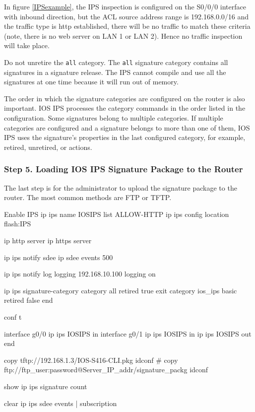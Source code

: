 In figure \ref{IPSexample}, the IPS inspection is configured on the S0/0/0 interface with inbound direction, but the ACL source address range is 192.168.0.0/16 and the traffic type is http established, there will be no traffic to match these criteria (note, there is no web server on LAN 1 or LAN 2). Hence no traffic inspection will take place.

\note Do not unretire the \verb|all| category. The \verb|all| signature category contains all signatures in a signature release. The IPS cannot compile and use all the signatures at one time because it will run out of memory.

\note The order in which the signature categories are configured on the router is also important. IOS IPS processes the category commands in the order listed in the configuration. Some signatures belong to multiple categories. If multiple categories are configured and a signature belongs to more than one of them, IOS IPS uses the signature’s properties in the last configured category, for example, retired, unretired, or actions.

\subsubsection{Step 5. Loading IOS IPS Signature Package to the Router}

The last step is for the administrator to upload the signature package to the router. The most common methods are FTP or TFTP. 

\begin{sexylisting}{Enable IPS}
ip ips name IOSIPS list ALLOW-HTTP
ip ips config location flash:IPS

ip http server
ip https server

ip ips notify sdee
ip sdee events 500

ip ips notify log
logging 192.168.10.100
logging on

ip ips signature-category
  category all
  retired true
exit
  category ios_ips basic
  retired false
end  

conf t

interface g0/0
  ip ips IOSIPS in
interface g0/1
  ip ips IOSIPS in
  ip ips IOSIPS out
end

copy tftp://192.168.1.3/IOS-S416-CLI.pkg idconf
# copy ftp://ftp_user:password@Server_IP_addr/signature_packg  idconf

show ip ips signature count 

clear ip ips sdee {events | subscription}
\end{sexylisting}

